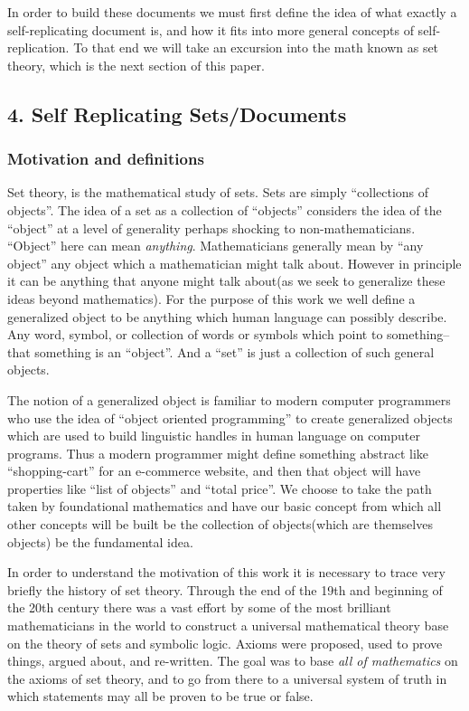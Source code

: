 \documentclass[12pt,a4paper]{amsart}
\numberwithin{equation}{section}
\begin{document}
In order to build these documents we must first define the idea of what
exactly a self-replicating document is, and how it fits into more
general concepts of self-replication. To that end we will take an
excursion into the math known as set theory, which is the next section
of this paper.

\subsection{4. Self Replicating
Sets/Documents}\label{self-replicating-setsdocuments}

\subsubsection{Motivation and
definitions}\label{motivation-and-definitions}

Set theory, is the mathematical study of sets. Sets are simply
``collections of objects''. The idea of a set as a collection of
``objects'' considers the idea of the ``object'' at a level of
generality perhaps shocking to non-mathematicians. ``Object'' here can
mean \emph{anything}. Mathematicians generally mean by ``any object''
any object which a mathematician might talk about. However in principle
it can be anything that anyone might talk about(as we seek to generalize
these ideas beyond mathematics). For the purpose of this work we well
define a generalized object to be anything which human language can
possibly describe. Any word, symbol, or collection of words or symbols
which point to something--that something is an ``object''. And a ``set''
is just a collection of such general objects.

The notion of a generalized object is familiar to modern computer
programmers who use the idea of ``object oriented programming'' to
create generalized objects which are used to build linguistic handles in
human language on computer programs. Thus a modern programmer might
define something abstract like ``shopping-cart'' for an e-commerce
website, and then that object will have properties like ``list of
objects'' and ``total price''. We choose to take the path taken by
foundational mathematics and have our basic concept from which all other
concepts will be built be the collection of objects(which are themselves
objects) be the fundamental idea.

In order to understand the motivation of this work it is necessary to
trace very briefly the history of set theory. Through the end of the
19th and beginning of the 20th century there was a vast effort by some
of the most brilliant mathematicians in the world to construct a
universal mathematical theory base on the theory of sets and symbolic
logic. Axioms were proposed, used to prove things, argued about, and
re-written. The goal was to base \emph{all of mathematics} on the axioms
of set theory, and to go from there to a universal system of truth in
which statements may all be proven to be true or false.
\end{document}
